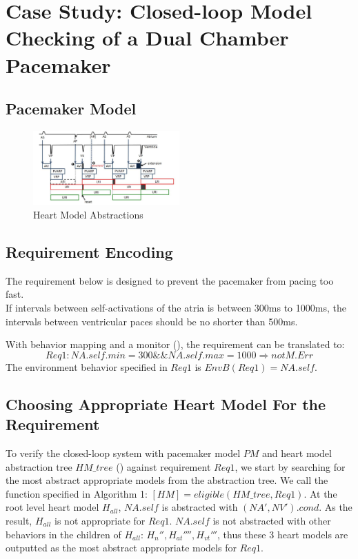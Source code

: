 \section{Case Study: Closed-loop Model Checking of a Dual Chamber Pacemaker}
\subsection{Pacemaker Model}
\begin{figure}[!t]
		\centering
		\includegraphics[width=0.5\textwidth]{figs/PM_timers.pdf}
		\caption{\small Heart Model Abstractions}
		\label{fig:PM_timers}
\end{figure}

\subsection{Requirement Encoding}
The requirement below is designed to prevent the pacemaker from pacing too fast.\\
\textsf{If intervals between self-activations of the atria is between 300ms to 1000ms, the intervals between ventricular paces should be no shorter than 500ms.}


With behavior mapping and a monitor (), the requirement can be translated to:
$$Req1: NA.self.min=300 \&\& NA.self.max=1000 \Rightarrow not M.Err$$
The environment behavior specified in $Req1$ is $EnvB(Req1)=NA.self$.
\subsection{Choosing Appropriate Heart Model For the Requirement}
To verify the closed-loop system with pacemaker model $PM$ and heart model abstraction tree $HM\_tree$ () against requirement $Req1$, we start by searching for the most abstract appropriate models from the abstraction tree. We call the function specified in Algorithm 1: $[HM]=eligible(HM\_tree,Req1)$. At the root level heart model $H_{all}$, $NA.self$ is abstracted with $(NA',NV').cond$. As the result, $H_{all}$ is not appropriate for $Req1$. $NA.self$ is not abstracted with other behaviors in the children of $H_{all}$: $H_n'',H_{at}'''',H_{vt}'''$, thus these 3 heart models are outputted as the most abstract appropriate models for $Req1$.
